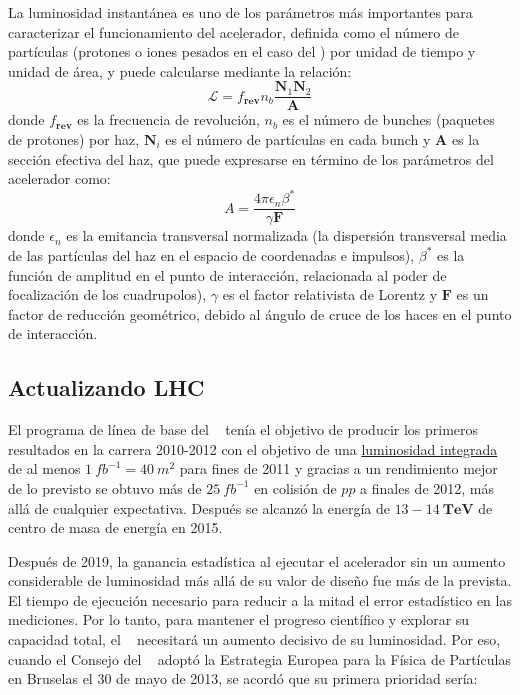 La luminosidad instantánea es uno de los parámetros más importantes para caracterizar el funcio­namiento del acelerador, definida como el número de partículas (protones o iones pesados en el caso del \LHC) por unidad de tiempo y unidad de área, y puede calcularse mediante la relación:
\begin{equation}
\mathcal{L} = f_\mathbf{rev} n_b \dfrac{\mathbf{N}_1 \mathbf{N}_2}{\mathbf{A}}
\end{equation}
donde $f_\mathbf{rev}$ es la frecuencia de revolución, $n_b$ es el número de bunches (paquetes de protones) por haz, $\mathbf{N}_i$ es el número de partículas en cada bunch y $\mathbf{A}$ es la sección efectiva del haz, que puede expresarse en término de los parámetros del acelerador como:
\begin{equation}
A = \dfrac{4 \pi \epsilon_n \beta^*}{\gamma \mathbf{F}}
\end{equation}
donde $\epsilon_n$ es la emitancia transversal normalizada (la dispersión transversal media de las partículas del haz en el espacio de coordenadas e impulsos), $\beta^*$ es la función de amplitud en el punto de interacción, relacionada al poder de focalización de los cuadrupolos), $\gamma$ es el factor relativista de Lorentz y $\mathbf{F}$ es un factor de reducción geométrico, debido al ángulo de cruce de los haces en el punto de interacción.


\subsection{Actualizando LHC}
El programa de línea de base del \LHC~ tenía el objetivo de producir los primeros resultados en la carrera 2010-2012 con el objetivo de una \href{https://es.wikipedia.org/wiki/Luminosidad}{luminosidad integrada} de al menos $1~fb^{-1} = 40~m^2$ para fines de 2011 y gracias a un rendimiento mejor de lo previsto se obtuvo más de $25~fb^{-1}$ en colisión de $pp$ a finales de 2012, más allá de cualquier expectativa. Después se alcanzó la energía de $13-14 ~ \textbf{TeV}$ de centro de masa de energía en 2015.

Después de 2019, la ganancia estadística al ejecutar el acelerador sin un aumento considerable de luminosidad más allá de su valor de diseño fue más de la prevista. El tiempo de ejecución necesario para reducir a la mitad el error estadístico en las mediciones. Por lo tanto, para mantener el progreso científico y explorar su capacidad total, el \LHC ~ necesitará un aumento decisivo de su luminosidad. Por eso, cuando el Consejo del \CERN ~ adoptó la Estrategia Europea para la Física de Partículas en Bruselas el 30 de mayo de 2013, se acordó que su primera prioridad sería:

